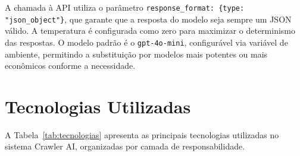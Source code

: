 \documentclass[tcc,capa]{texifsul}
\begin{document}
A chamada à API utiliza o parâmetro \texttt{response\_format: \{type: "json\_object"\}}, que garante que a resposta do modelo seja sempre um JSON válido. A temperatura é configurada como zero para maximizar o determinismo das respostas. O modelo padrão é o \texttt{gpt-4o-mini}, configurável via variável de ambiente, permitindo a substituição por modelos mais potentes ou mais econômicos conforme a necessidade.

\section{Tecnologias Utilizadas}

A Tabela~\ref{tab:tecnologias} apresenta as principais tecnologias utilizadas no sistema Crawler AI, organizadas por camada de responsabilidade.
\end{document}

